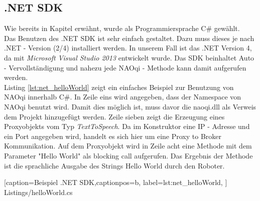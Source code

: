 \subsection{.NET SDK}
Wie bereits in Kapitel  erwähnt, wurde als Programmiersprache C\# gewählt. 
\\
Das Benutzen des .NET SDK ist sehr einfach gestaltet. Dazu muss dieses je nach .NET - Version (2/4) installiert werden. In unserem Fall ist das .NET Version 4, da mit \textit{Microsoft Visual Studio 2013} entwickelt wurde. Das SDK beinhaltet Auto - Vervollständigung und nahezu jede NAOqi - Methode kann damit aufgerufen werden.
\\
 Listing \ref{lst:net_helloWorld} zeigt ein einfaches Beispiel zur Benutzung von NAOqi innerhalb C\#. In Zeile eins wird angegeben, dass der Namespace von NAOqi benutzt wird. Damit dies möglich ist, muss davor die \textsf{naoqi.dll} als Verweis dem Projekt hinzugefügt werden. Zeile sieben zeigt die Erzeugung eines Proxyobjekts vom Typ \textit{TextToSpeech}. Da im Konstruktor eine IP - Adresse und ein Port angegeben wird, handelt es sich hier um eine Proxy to Broker Kommunikation. Auf dem Proxyobjekt wird in Zeile acht eine Methode mit dem Parameter \textsf{"Hello World"} als blocking call aufgerufen. Das Ergebnis der Methode ist die sprachliche Ausgabe des Strings \textsf{Hello World} durch den Roboter.


    [caption={Beispiel .NET SDK},captionpos=b,
       label=lst:net_helloWorld,
       ]	
 {Listings/helloWorld.cs}

